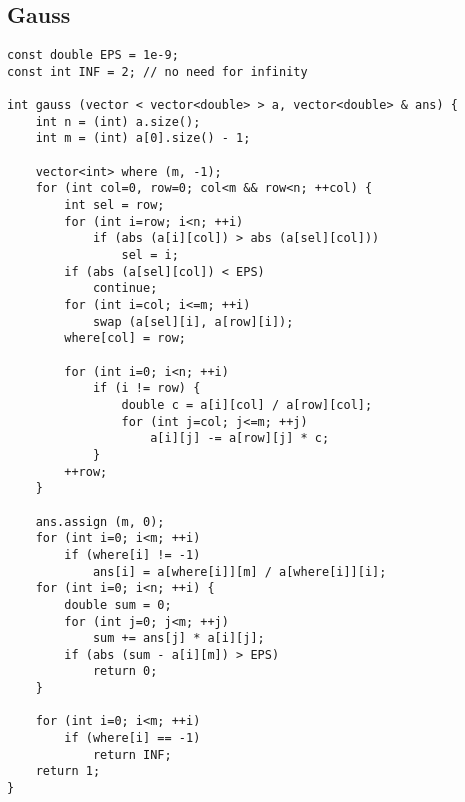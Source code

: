 \subsection{Gauss}
\begin{lstlisting}
const double EPS = 1e-9;
const int INF = 2; // no need for infinity

int gauss (vector < vector<double> > a, vector<double> & ans) {
    int n = (int) a.size();
    int m = (int) a[0].size() - 1;

    vector<int> where (m, -1);
    for (int col=0, row=0; col<m && row<n; ++col) {
        int sel = row;
        for (int i=row; i<n; ++i)
            if (abs (a[i][col]) > abs (a[sel][col]))
                sel = i;
        if (abs (a[sel][col]) < EPS)
            continue;
        for (int i=col; i<=m; ++i)
            swap (a[sel][i], a[row][i]);
        where[col] = row;

        for (int i=0; i<n; ++i)
            if (i != row) {
                double c = a[i][col] / a[row][col];
                for (int j=col; j<=m; ++j)
                    a[i][j] -= a[row][j] * c;
            }
        ++row;
    }

    ans.assign (m, 0);
    for (int i=0; i<m; ++i)
        if (where[i] != -1)
            ans[i] = a[where[i]][m] / a[where[i]][i];
    for (int i=0; i<n; ++i) {
        double sum = 0;
        for (int j=0; j<m; ++j)
            sum += ans[j] * a[i][j];
        if (abs (sum - a[i][m]) > EPS)
            return 0;
    }

    for (int i=0; i<m; ++i)
        if (where[i] == -1)
            return INF;
    return 1;
}
\end{lstlisting}
